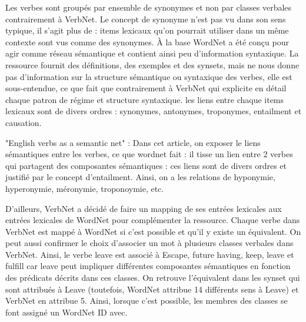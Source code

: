 Les verbes sont groupés par ensemble de synonymes et non par classes verbales contrairement à VerbNet. Le concept de synonyme n'est pas vu dans son sens typique, il s'agit plus de : items lexicaux qu'on pourrait utiliser dans un même contexte sont vus comme des synonymes. À la base WordNet a été conçu pour agir comme réseau sémantique et contient ainsi peu d'information syntaxique. La ressource fournit des définitions, des exemples et des synsets, mais ne nous donne pas d'information sur la structure sémantique ou syntaxique des verbes, elle est sous-entendue, ce que fait que contrairement à VerbNet qui explicite en détail chaque patron de régime et structure syntaxique. les liens entre chaque items lexicaux sont de divers ordres : synonymes, antonymes, troponymes, entailment et causation.\citep{SchulerVerbnetBroadcoverageComprehensive2005}

"English verbs as a semantic net" \citep{Fellbaum1998} : Dans cet article, on exposer le liens sémantiques entre les verbes, ce que wordnet fait : il tisse un lien entre 2 verbes qui partagent des composantes sémantiques : ces liens sont de divers ordres et justifié par le concept d'entailment. Ainsi, on a les relations de hyponymie, hyperonymie, méronymie, troponoymie, etc.

D'ailleurs, VerbNet a décidé de faire un mapping de ses entrées lexicales aux entrées lexicales de WordNet pour complémenter la ressource. Chaque verbe dans VerbNet est mappé à WordNet si c'est possible et qu'il y existe un équivalent. On peut aussi confirmer le choix d'associer un mot à plusieurs classes verbales dans VerbNet. Ainsi, le verbe leave est associé à Escape, future having, keep, leave et fulfill car leave peut impliquer différentes composantes sémantiques en fonction des prédicats décrits dans ces classes. On retrouve l'équivalent dans les synset qui sont attribués à Leave (toutefois, WordNet attribue 14 différents sens à Leave) et VerbNet en attribue 5. Ainsi, lorsque c'est possible, les membres des classes se font assigné un WordNet ID avec. 

